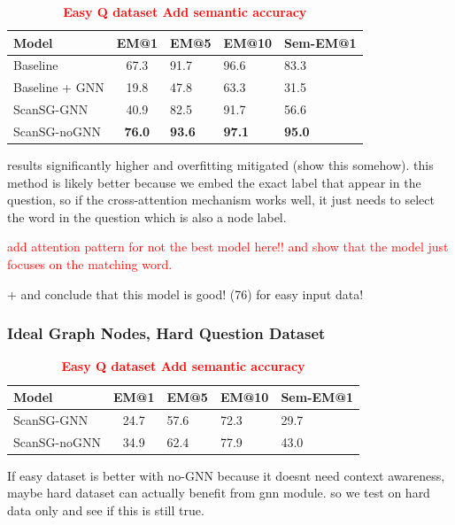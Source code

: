 \begin{table}[h!]
    \centering
    \caption{\textcolor{red}{\textbf{Easy Q dataset Add semantic accuracy}}}
    \begin{tabular}{|l|c|l|l|l|}
    \hline
    \textbf{Model}         & \textbf{EM@1} & \textbf{EM@5} & \textbf{EM@10} & \textbf{Sem-EM@1} \\ \hline
    Baseline               & 67.3 & 91.7 & 96.6 & 83.3 \\ \hline
    Baseline + GNN         & 19.8 & 47.8 & 63.3 & 31.5 \\ \hline
    ScanSG-GNN             & 40.9 & 82.5 & 91.7 & 56.6 \\ \hline
    ScanSG-noGNN           & \textbf{76.0} & \textbf{93.6} & \textbf{97.1} & \textbf{95.0} \\ \hline
    \end{tabular}
\end{table}

results significantly higher and overfitting mitigated (show this somehow).
this method is likely better because we embed the exact label that appear in the question, so if the cross-attention mechanism works well, it just needs to select the word in the question which is also a node label.

\textcolor{red}{add attention pattern for not the best model here!! and show that the model just focuses on the matching word.}

+ and conclude that this model is good! (76) for easy input data!

\subsubsection{Ideal Graph Nodes, Hard Question Dataset}
\begin{table}[h!]
    \centering
    \caption{\textcolor{red}{\textbf{Easy Q dataset Add semantic accuracy}}}
    \begin{tabular}{|l|c|l|l|l|}
    \hline
    \textbf{Model}         & \textbf{EM@1} & \textbf{EM@5} & \textbf{EM@10} & \textbf{Sem-EM@1}\\ \hline
    ScanSG-GNN   & 24.7 & 57.6 & 72.3 & 29.7 \\ \hline
    ScanSG-noGNN & 34.9 & 62.4 & 77.9 & 43.0 \\ \hline
    \end{tabular}
\end{table}

If easy dataset is better with no-GNN because it doesnt need context awareness, maybe hard dataset can actually benefit from gnn module. so we test on hard data only and see if this is still true.

